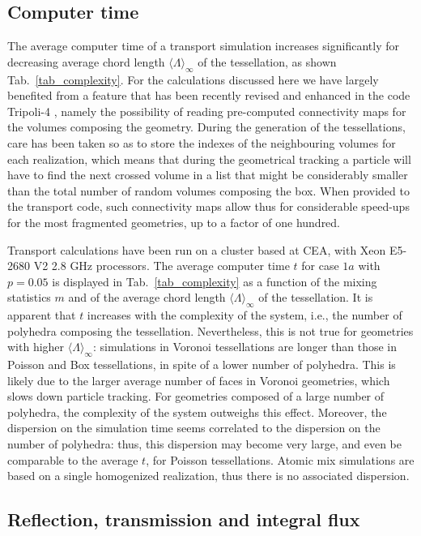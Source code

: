 \documentclass[final,authoryear,5p,times,twocolumn]{elsarticle}
\newcommand{\tripoli}{{\sc Tripoli-4}\textsuperscript{ \textregistered}}
\begin{document}
\subsection{Computer time}

The average computer time of a transport simulation increases significantly for decreasing average chord length ${\langle \Lambda \rangle}_{\infty}$ of the tessellation, as shown Tab.~\ref{tab_complexity}. For the calculations discussed here we have largely benefited from a feature that has been recently revised and enhanced in the code \tripoli{}, namely the possibility of reading pre-computed connectivity maps for the volumes composing the geometry. During the generation of the tessellations, care has been taken so as to store the indexes of the neighbouring volumes for each realization, which means that during the geometrical tracking a particle will have to find the next crossed volume in a list that might be considerably smaller than the total number of random volumes composing the box. When provided to the transport code, such connectivity maps allow thus for considerable speed-ups for the most fragmented geometries, up to a factor of one hundred.

Transport calculations have been run on a cluster based at CEA, with Xeon E5-2680 V2 2.8 GHz processors. The average computer time $t$ for case $1a$ with $p=0.05$ is displayed in Tab.~\ref{tab_complexity} as a function of the mixing statistics $m$ and of the average chord length ${\langle \Lambda \rangle}_{\infty}$ of the tessellation. It is apparent that $t$ increases with the complexity of the system, i.e., the number of polyhedra composing the tessellation. Nevertheless, this is not true for geometries with higher ${\langle \Lambda \rangle}_{\infty}$: simulations in Voronoi tessellations are longer than those in Poisson and Box tessellations, in spite of a lower number of polyhedra. This is likely due to the larger average number of faces in Voronoi geometries, which slows down particle tracking. For geometries composed of a large number of polyhedra, the complexity of the system outweighs this effect. Moreover, the dispersion on the simulation time seems correlated to the dispersion on the number of polyhedra: thus, this dispersion may become very large, and even be comparable to the average $t$, for Poisson tessellations. Atomic mix simulations are based on a single homogenized realization, thus there is no associated dispersion.

\subsection{Reflection, transmission and integral flux}
\end{document}
